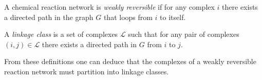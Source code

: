 \documentclass[smallextended]{svjour3}       %
\newcommand*{\0}{\mathbf{0}}
\newcommand*{\1}{\mathbf{1}}
\begin{document}
\begin{defn} 
	A chemical reaction network is \emph{weakly reversible} if for any
    complex $i$ there exists a directed path in the graph $G$ that loops
    from $i$ to itself.
\end{defn} 

\begin{defn} 
    A \emph{linkage class} is a set of complexes $\mathcal{L}$ such that for any pair of complexes
    $(i,j) \in \mathcal{L}$ there exists a directed path in $G$ from $i$ to $j$. 
\end{defn}

From these definitions one can deduce that the complexes of a weakly reversible 
reaction network must partition into linkage classes.
\end{document}
